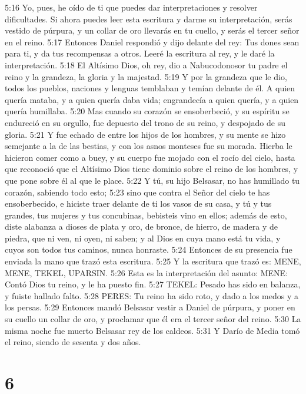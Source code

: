 5:16 Yo, pues, he oído de ti que puedes dar interpretaciones y resolver dificultades. Si ahora puedes leer esta escritura y darme su interpretación, serás vestido de púrpura, y un collar de oro llevarás en tu cuello, y serás el tercer señor en el reino.  
5:17 Entonces Daniel respondió y dijo delante del rey: Tus dones sean para ti, y da tus recompensas a otros. Leeré la escritura al rey, y le daré la interpretación.  
5:18 El Altísimo Dios, oh rey, dio a Nabucodonosor tu padre el reino y la grandeza, la gloria y la majestad.  
5:19 Y por la grandeza que le dio, todos los pueblos, naciones y lenguas temblaban y temían delante de él. A quien quería mataba, y a quien quería daba vida; engrandecía a quien quería, y a quien quería humillaba.  
5:20 Mas cuando su corazón se ensoberbeció, y su espíritu se endureció en su orgullo, fue depuesto del trono de su reino, y despojado de su gloria.  
5:21 Y fue echado de entre los hijos de los hombres, y su mente se hizo semejante a la de las bestias, y con los asnos monteses fue su morada. Hierba le hicieron comer como a buey, y su cuerpo fue mojado con el rocío del cielo, hasta que reconoció que el Altísimo Dios tiene dominio sobre el reino de los hombres, y que pone sobre él al que le place.  
5:22 Y tú, su hijo Belsasar, no has humillado tu corazón, sabiendo todo esto;  
5:23 sino que contra el Señor del cielo te has ensoberbecido, e hiciste traer delante de ti los vasos de su casa, y tú y tus grandes, tus mujeres y tus concubinas, bebisteis vino en ellos; además de esto, diste alabanza a dioses de plata y oro, de bronce, de hierro, de madera y de piedra, que ni ven, ni oyen, ni saben; y al Dios en cuya mano está tu vida, y cuyos son todos tus caminos, nunca honraste.  
5:24 Entonces de su presencia fue enviada la mano que trazó esta escritura.  
5:25 Y la escritura que trazó es: MENE, MENE, TEKEL, UPARSIN.  
5:26 Esta es la interpretación del asunto: MENE: Contó Dios tu reino, y le ha puesto fin.  
5:27 TEKEL: Pesado has sido en balanza, y fuiste hallado falto.  
5:28 PERES: Tu reino ha sido roto, y dado a los medos y a los persas.  
5:29 Entonces mandó Belsasar vestir a Daniel de púrpura, y poner en su cuello un collar de oro, y proclamar que él era el tercer señor del reino.  
5:30 La misma noche fue muerto Belsasar rey de los caldeos.  
5:31 Y Darío de Media tomó el reino, siendo de sesenta y dos años. 

\chapter{6}

